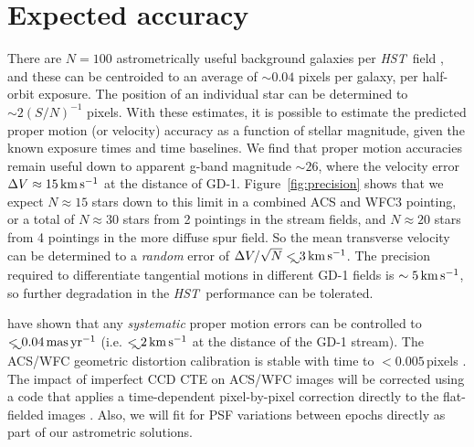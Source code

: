 \documentclass[12pt]{article}
\newcommand{\hst}{\textsl{HST}}
\begin{document}
\section*{Expected accuracy}
There are $N=100$ astrometrically useful background galaxies per \hst\ field \parencite[e.g.,][]{sohn2012,sohn2013}, and these can be centroided to an average of $\sim0.04$ pixels per galaxy, per half-orbit exposure.
The position of an individual star can be determined to $\sim2(S/N)^{-1}$ pixels.
With these estimates, it is possible to estimate the predicted proper motion (or velocity) accuracy as a function of stellar magnitude, given the known exposure times and time baselines.
We find that proper motion accuracies remain useful down to apparent g-band magnitude $\sim26$, where the velocity error $\Delta V\approx15\,\rm km\,s^{-1}$ at the distance of GD-1.
Figure~\ref{fig:precision} shows that we expect $N\approx15$ stars down to this limit in a combined ACS and WFC3 pointing, or a total of $N\approx30$ stars from 2 pointings in the stream fields, and $N\approx20$ stars from 4 pointings in the more diffuse spur field. 
So the mean transverse velocity can be determined to a \emph{random} error of $\Delta V/\sqrt{N}\lesssim3\,\rm km\,s^{-1}$.
The precision required to differentiate tangential motions in different GD-1 fields is $\sim5\,\rm km\,s^{-1}$, so further degradation in the \hst\ performance can be tolerated.
 
\textcite{sohn2012, sohn2013} have shown that any \emph{systematic} proper motion errors can be controlled to $\lesssim0.04\,\rm mas\,yr^{-1}$ (i.e. $\lesssim2\,\rm km\,s^{-1}$ at the distance of the GD-1 stream).
The ACS/WFC geometric distortion calibration is stable with time to $<0.005$\,pixels \parencite{anderson2007}.
The impact of imperfect CCD CTE on ACS/WFC images will be corrected using a code that applies a time-dependent pixel-by-pixel correction directly to the flat-fielded images \parencite{andersonbedin2010}.
Also, we will fit for PSF variations between epochs directly as part of our astrometric solutions.
\end{document}

